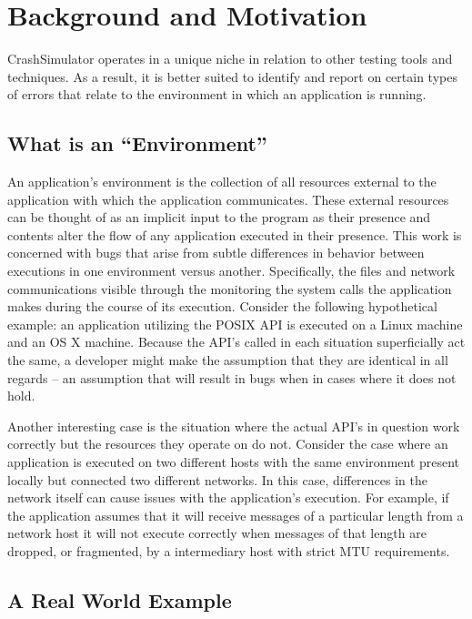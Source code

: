 \section{Background and Motivation}

CrashSimulator operates in a unique niche in relation to other testing tools and techniques. As a result, it is better
suited to identify and report on certain types of errors that relate to the environment in which an application is
running.

    \subsection{What is an ``Environment''}

    An application's environment is the collection of all resources external to the application with which the
    application communicates.  These external resources can be thought of as an implicit input to the program as their
    presence and contents alter the flow of any application executed in their presence.  This work is concerned with
    bugs that arise from subtle differences in behavior between executions in one environment versus
    another. Specifically, the files and network communications visible through the monitoring the system calls the
    application makes during the course of its execution.  Consider the following hypothetical example: an application
    utilizing the POSIX API is executed on a Linux machine and an OS X machine.  Because the API's called in each
    situation superficially act the same, a developer might make the assumption that they are identical in all regards
    -- an assumption that will result in bugs when in cases where it does not hold.

    Another interesting case is the situation where the actual API's in question work correctly but the resources they
    operate on do not.  Consider the case where an application is executed on two different hosts with the same
    environment present locally but connected two different networks.  In this case, differences in the network itself
    can cause issues with the application's execution.  For example, if the application assumes that it will receive
    messages of a particular length from a network host it will not execute correctly when messages of that length are
    dropped, or fragmented, by a intermediary host with strict MTU requirements.

    \subsection{A Real World Example}

